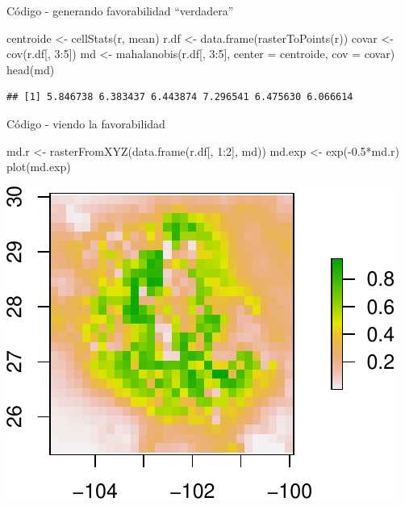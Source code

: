 \documentclass[
  11pt,
  ignorenonframetext,
]{beamer}
\newenvironment{Shaded}{}{}
\newcommand{\AttributeTok}[1]{\textcolor[rgb]{0.49,0.56,0.16}{#1}}
\newcommand{\DecValTok}[1]{\textcolor[rgb]{0.25,0.63,0.44}{#1}}
\newcommand{\FloatTok}[1]{\textcolor[rgb]{0.25,0.63,0.44}{#1}}
\newcommand{\FunctionTok}[1]{\textcolor[rgb]{0.02,0.16,0.49}{#1}}
\newcommand{\NormalTok}[1]{#1}
\newcommand{\OtherTok}[1]{\textcolor[rgb]{0.00,0.44,0.13}{#1}}
\newcommand{\SpecialCharTok}[1]{\textcolor[rgb]{0.25,0.44,0.63}{#1}}
\begin{document}
\begin{frame}[fragile]{Código - generando favorabilidad ``verdadera''}
\protect\hypertarget{cuxf3digo---generando-favorabilidad-verdadera}{}
\begin{Shaded}
\begin{Highlighting}[]
\NormalTok{centroide }\OtherTok{\textless{}{-}} \FunctionTok{cellStats}\NormalTok{(r, mean)}
\NormalTok{r.df }\OtherTok{\textless{}{-}} \FunctionTok{data.frame}\NormalTok{(}\FunctionTok{rasterToPoints}\NormalTok{(r))}
\NormalTok{covar }\OtherTok{\textless{}{-}} \FunctionTok{cov}\NormalTok{(r.df[, }\DecValTok{3}\SpecialCharTok{:}\DecValTok{5}\NormalTok{])}
\NormalTok{md }\OtherTok{\textless{}{-}} \FunctionTok{mahalanobis}\NormalTok{(r.df[, }\DecValTok{3}\SpecialCharTok{:}\DecValTok{5}\NormalTok{], }\AttributeTok{center =}\NormalTok{ centroide, }\AttributeTok{cov =}\NormalTok{ covar)}
\FunctionTok{head}\NormalTok{(md)}
\end{Highlighting}
\end{Shaded}

\begin{verbatim}
## [1] 5.846738 6.383437 6.443874 7.296541 6.475630 6.066614
\end{verbatim}
\end{frame}

\begin{frame}[fragile]{Código - viendo la favorabilidad}
\protect\hypertarget{cuxf3digo---viendo-la-favorabilidad}{}
\begin{Shaded}
\begin{Highlighting}[]
\NormalTok{md.r }\OtherTok{\textless{}{-}} \FunctionTok{rasterFromXYZ}\NormalTok{(}\FunctionTok{data.frame}\NormalTok{(r.df[, }\DecValTok{1}\SpecialCharTok{:}\DecValTok{2}\NormalTok{], md))}
\NormalTok{md.exp }\OtherTok{\textless{}{-}} \FunctionTok{exp}\NormalTok{(}\SpecialCharTok{{-}}\FloatTok{0.5}\SpecialCharTok{*}\NormalTok{md.r)}
\FunctionTok{plot}\NormalTok{(md.exp)}
\end{Highlighting}
\end{Shaded}

\begin{center}\includegraphics{Tutorial-spatstat-2_files/figure-beamer/unnamed-chunk-4-1} \end{center}
\end{frame}
\end{document}
